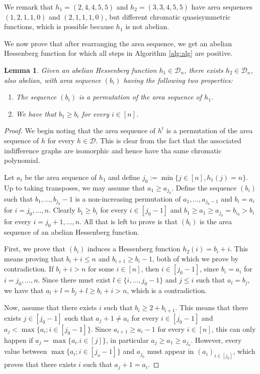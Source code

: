 \documentclass[10pt]{amsart}
\newtheorem{Lem}{Lemma}[section]
\theoremstyle{definition}
\newcommand{\D}{\mathcal{D}}
\begin{document}
We remark that $h_1=(2,4,4,5,5)$ and $h_2=(3,3,4,5,5)$ have area sequences $(1,2,1,1,0)$ and $(2,1,1,1,0)$, but different chromatic quasisymmetric functions, which is possible because $h_1$ is not abelian. \par
 We now prove that after rearranging the area sequence, we get an abelian Hessenberg function for which all steps in Algorithm \ref{alg:alg} are positive.

\begin{Lem}
\label{lem:abelian}
Given an abelian Hessenberg function $h_1\in \D_n$, there exists $h_2\in \D_n$, also abelian, with area sequence $(b_i)$ having the following two properties:
\begin{enumerate}
    \item The sequence $(b_i)$ is a permutation of the area sequence of $h_1$.
    \item We have that $b_1\geq b_i$ for every $i\in [n]$.
\end{enumerate}
\end{Lem}
\begin{proof}
We begin noting that the area sequence of $h^t$ is a permutation of the area sequence of $h$ for every $h\in \D$. This is clear from the fact that the associated indifference graphs are isomorphic and hence have tha same chromatic polynomial.\par


  Let $a_i$ be the area sequence of $h_1$ and define $j_0:=\min\{j\in [n], h_1(j)=n\}$. Up to taking transposes, we may assume that $a_1\geq a_{j_0}$. Define the sequence $(b_i)$ such that $b_1,\ldots, b_{j_0}-1$ is a non-increasing permutation of $a_1,\ldots, a_{j_0-1}$ and $b_i=a_i$ for $i=j_0,\ldots, n$. Clearly $b_1\geq b_i$ for every $i\in [j_0-1]$ and $b_1\geq a_1\geq a_{j_0}=b_{i_0}> b_i$ for every $i=j_0+1,\ldots, n$. All that is left to prove is that $(b_i)$ is the area sequence of an abelian Hessenberg function. \par
  First, we prove that $(b_i)$ induces a Hessenberg function $h_2(i)=b_i+i$. This means proving that $b_i+i\leq n$ and $b_{i+1}\geq b_i-1$, both of which we prove by contradiction.  If $b_i+i>n$ for some $i\in [n]$, then $i\in [j_0-1]$, since $b_i=a_i$ for $i=j_0,\ldots, n$. Since there must exist $l\in\{i,\ldots, j_0-1\}$ and $j\leq i$ such that $a_l=b_j$, we have that $a_l+l=b_j+l\geq b_i+i>n$, which is a contradiction.\par
   Now, assume that there exists $i$ such that $b_i\geq 2+b_{i+1}$. This means that there exists $j\in [j_0-1]$ such that $a_{j}+1\neq a_{i}$ for every $i\in [j_0-1]$  and $a_j<\max\{a_i;i\in [j_0-1]\}$. Since $a_{i+1}\geq a_i-1$ for every $i\in [n]$, this can only happen if $a_j=\max\{a_i.i\in [j]\}$, in particular $a_j\geq a_1\geq a_{j_0}$. However, every value between $\max\{a_i;i\in [j_o-1]\}$ and $a_{j_0}$ must appear in $(a_i)_{i\in [j_0]}$, which proves that there exists $i$ such that $a_j+1=a_i$.
\end{proof}
\end{document}
